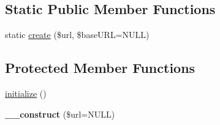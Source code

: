 \subsection*{Static Public Member Functions}
\begin{DoxyCompactItemize}
\item 
static \hyperlink{class_able_polecat___access_control___resource___locater_af3a9a1be2aeb050fe1457eb821ecd4f7}{create} (\$url, \$base\+U\+R\+L=N\+U\+L\+L)
\end{DoxyCompactItemize}
\subsection*{Protected Member Functions}
\begin{DoxyCompactItemize}
\item 
\hyperlink{class_able_polecat___access_control___resource___locater_a91098fa7d1917ce4833f284bbef12627}{initialize} ()
\item 
\hypertarget{class_able_polecat___access_control___resource___locater_ad8052312878a94f5d601acc5bd8f9d15}{}{\bfseries \+\_\+\+\_\+construct} (\$url=N\+U\+L\+L)\label{class_able_polecat___access_control___resource___locater_ad8052312878a94f5d601acc5bd8f9d15}

\end{DoxyCompactItemize}
